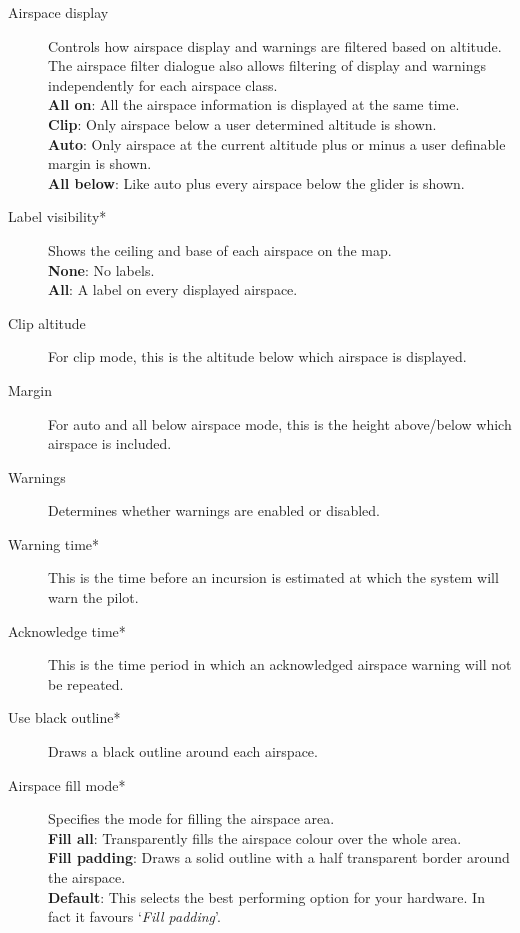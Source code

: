\begin{description}
\item[Airspace display]  Controls how airspace display and warnings are filtered 
  based on altitude.  The airspace filter dialogue also allows filtering
  of display and warnings independently for each airspace class. \\
  {\bf All on}: All the airspace information is displayed at the same time. \\
  {\bf Clip}: Only airspace below a user determined altitude is shown. \\
  {\bf Auto}: Only airspace at the current altitude plus or minus a user 
    definable margin is shown.
 \\
  {\bf All below}:  Like auto plus every airspace below the glider is shown.
\item[Label visibility*]  Shows the ceiling and base of each airspace
  on the map. \\
  {\bf None}:  No labels. \\
  {\bf All}:  A label on every displayed airspace.
\item[Clip altitude] For clip mode, this is the altitude below which airspace 
  is displayed.
\item[Margin]  For auto and all below airspace mode, this is the height 
  above/below which airspace is included.
\item[Warnings]  Determines whether warnings are enabled or disabled.
\item[Warning time*]  This is the time before an incursion is estimated at
  which the system will warn the pilot.
\item[Acknowledge time*]  This is the time period in which an acknowledged airspace 
  warning will not be repeated.
\item[Use black outline*]  Draws a black outline around each airspace.
\item[Airspace fill mode*]  Specifies the mode for filling the airspace area. \\
  {\bf Fill all}:  Transparently fills the airspace colour over the whole area. \\
  {\bf Fill padding}: Draws a solid outline with a half transparent border 
    around the airspace. \\
  {\bf Default}:  This selects the best performing option for your hardware. In fact 
    it favours `{\it Fill padding}'.
\end{description}

